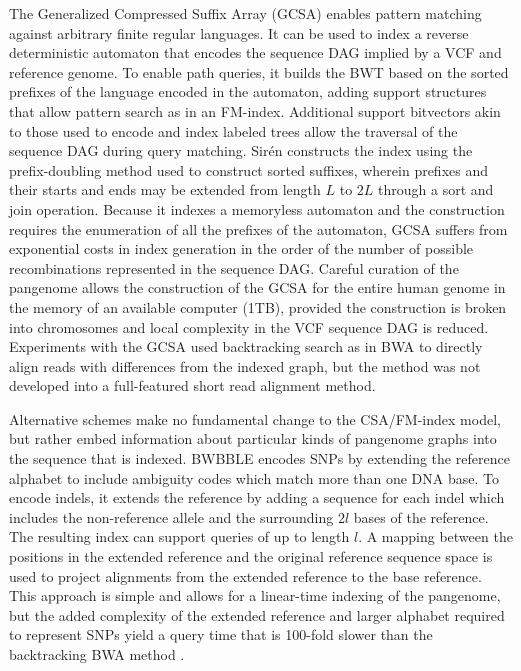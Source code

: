 The Generalized Compressed Suffix Array (GCSA) \cite{siren2011indexing,siren2014indexing} enables pattern matching against arbitrary finite regular languages.
It can be used to index a reverse deterministic automaton that encodes the sequence DAG implied by a VCF and reference genome.
To enable path queries, it builds the BWT based on the sorted prefixes of the language encoded in the automaton, adding support structures that allow pattern search as in an FM-index.
Additional support bitvectors akin to those used to encode and index labeled trees \cite{ferragina2005structuring} allow the traversal of the sequence DAG during query matching.
Sir\'{e}n constructs the index using the prefix-doubling method used to construct sorted suffixes, wherein prefixes and their starts and ends may be extended from length $L$ to $2L$ through a sort and join operation.
Because it indexes a memoryless automaton and the construction requires the enumeration of all the prefixes of the automaton, GCSA suffers from exponential costs in index generation in the order of the number of possible recombinations represented in the sequence DAG.
Careful curation of the pangenome allows the construction of the GCSA for the entire human genome in the memory of an available computer (1TB), provided the construction is broken into chromosomes and local complexity in the VCF sequence DAG is reduced.
Experiments with the GCSA used backtracking search as in BWA \cite{li2009fast} to directly align reads with differences from the indexed graph, but the method was not developed into a full-featured short read alignment method.

Alternative schemes make no fundamental change to the CSA/FM-index model, but rather embed information about particular kinds of pangenome graphs into the sequence that is indexed.
BWBBLE \cite{huang2013short} encodes SNPs by extending the reference alphabet to include ambiguity codes which match more than one DNA base.
To encode indels, it extends the reference by adding a sequence for each indel which includes the non-reference allele and the surrounding $2l$ bases of the reference.
The resulting index can support queries of up to length $l$.
A mapping between the positions in the extended reference and the original reference sequence space is used to project alignments from the extended reference to the base reference.
This approach is simple and allows for a linear-time indexing of the pangenome, but the added complexity of the extended reference and larger alphabet required to represent SNPs yield a query time that is 100-fold slower than the backtracking BWA method \cite{huang2013short}.

